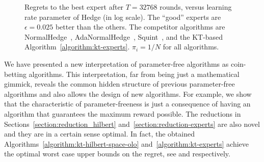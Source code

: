 \begin{figure}[t]
\centering
{}
\caption{\footnotesize{Regrets to the best expert after $T = 32768$ rounds,
versus learning rate parameter of Hedge (in log scale). The ``good'' experts
are $\epsilon=0.025$ better than the others. The competitor algorithms are
NormalHedge~\cite{Chaudhuri-Freund-Hsu-2009},
AdaNormalHedge~\cite{Luo-Schapire-2015}, Squint~\cite{Koolen-van-Erven-2015},
and the KT-based Algorithm~\ref{algorithm:kt-experts}. $\pi_i=1/N$ for all
algorithms.}}
\label{fig:exp_lea}
\end{figure}

We have presented a new interpretation of parameter-free algorithms as
coin-betting algorithms. This interpretation, far from being just a
mathematical gimmick, reveals the common hidden structure of previous
parameter-free algorithms and also allows the design of new algorithms. For
example, we show that the characteristic of parameter-freeness is just a
consequence of having an algorithm that guarantees the maximum reward possible.
The reductions in Sections~\ref{section:reduction_hilbert}
and~\ref{section:reduction-experts} are also novel and they are in a certain
sense optimal. In fact, the obtained
Algorithms~\ref{algorithm:kt-hilbert-space-olo} and~\ref{algorithm:kt-experts}
achieve the optimal worst case upper bounds on the regret, see
\cite{Streeter-McMahan-2012,Orabona-2013} and \cite{Cesa-Bianchi-Lugosi-2006}
respectively.

